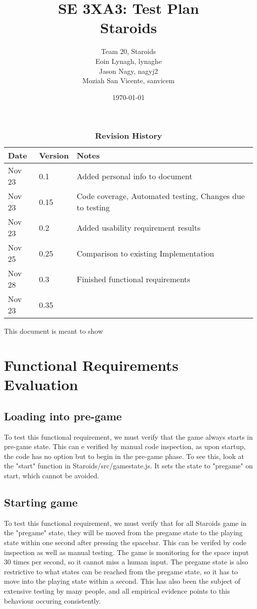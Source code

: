 \documentclass[12pt, titlepage]{article}
\title{SE 3XA3: Test Plan\\Staroids}
\author{Team 20, Staroids
		\\ Eoin Lynagh, lynaghe
		\\ Jason Nagy, nagyj2
		\\ Moziah San Vicente, sanvicem
}
\date{\today}
\begin{document}
\maketitle

\tableofcontents
\listoftables
\listoffigures

\begin{table}[bp]
\caption{\bf Revision History}
\begin{tabularx}{\textwidth}{p{3cm}p{2cm}X}
\toprule {\bf Date} & {\bf Version} & {\bf Notes}\\
\midrule
Nov 23 & 0.1 & Added personal info to document\\
Nov 23 & 0.15 & Code coverage, Automated testing, Changes due to testing\\
Nov 23 & 0.2 & Added usability requirement results\\
Nov 25 & 0.25 & Comparison to existing Implementation\\
Nov 28 & 0.3 & Finished functional requirements\\
Nov 23 & 0.35 & \\
\bottomrule
\end{tabularx}
\end{table}

\newpage


This document is meant to show \\

\section{Functional Requirements Evaluation}
\subsection{Loading into pre-game}
To test this functional requirement, we must verify that the game always starts in pre-game state. This can e verified by manual code inspection, as upon startup, the code has no option but to begin in the pre-game phase. To see this, look at the "start" function in Staroids/src/gamestate.js. It sets the state to "pregame" on start, which cannot be avoided.
\subsection{Starting game}
To test this functional requirement, we must verify that for all Staroids game in the "pregame" state, they will be moved from the pregame state to the playing state within one second after pressing the spacebar. This can be verifed by code inspection as well as manual testing. The game is monitoring for the space input 30 times per second, so it cannot miss a human input. The pregame state is also restrictive to what states can be reached from the pregame state, so it has to move into the playing state within a second. This has also been the subject of extensive testing by many people, and all empirical evidence points to this behaviour occuring consistently.
\end{document}
